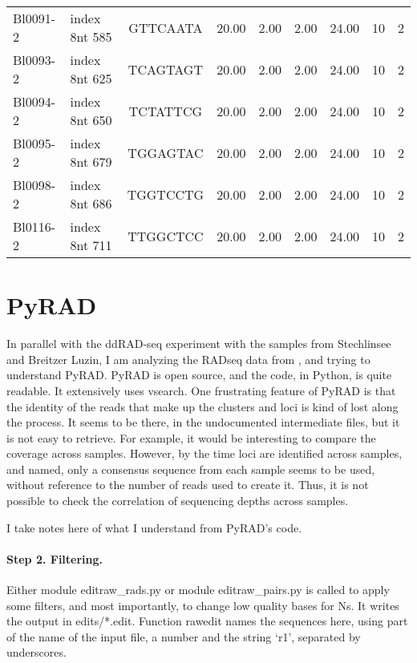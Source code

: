 \documentclass[a4paper,12pt,twosided]{article}
\begin{document}
\begin{table}
\begin{center}
{\begin{tabular}{llcrrrrrr}
Bl0091-2&index 8nt 585&GTTCAATA&20.00&2.00&2.00&24.00&10&2\\
Bl0093-2&index 8nt 625&TCAGTAGT&20.00&2.00&2.00&24.00&10&2\\
Bl0094-2&index 8nt 650&TCTATTCG&20.00&2.00&2.00&24.00&10&2\\
Bl0095-2&index 8nt 679&TGGAGTAC&20.00&2.00&2.00&24.00&10&2\\
Bl0098-2&index 8nt 686&TGGTCCTG&20.00&2.00&2.00&24.00&10&2\\
Bl0116-2&index 8nt 711&TTGGCTCC&20.00&2.00&2.00&24.00&10&2\\
\bottomrule
\end{tabular}}
\end{center}
\end{table}

\section{PyRAD}
In parallel with the ddRAD-seq experiment with the samples from Stechlinsee and Breitzer Luzin, I am analyzing the RADseq data from \cite{Gagnaire2013}, and trying to understand PyRAD. PyRAD is open source, and the code, in Python, is quite readable. It extensively uses vsearch. One frustrating feature of PyRAD is that the identity of the reads that make up the clusters and loci is kind of lost along the process. It seems to be there, in the undocumented intermediate files, but it is not easy to retrieve. For example, it would be interesting to compare the coverage across samples. However, by the time loci are identified across samples, and named, only a consensus sequence from each sample seems to be used, without reference to the number of reads used to create it. Thus, it is not possible to check the correlation of sequencing depths across samples.

I take notes here of what I understand from PyRAD's code.

\paragraph{Step 2. Filtering.}
Either module editraw\_rads.py or module editraw\_pairs.py is called to apply some filters, and most importantly, to change low quality bases for Ns. It writes the output in edits/*.edit. Function rawedit names the sequences here, using part of the name of the input file, a number and the string `r1', separated by underscores.
\end{document}
